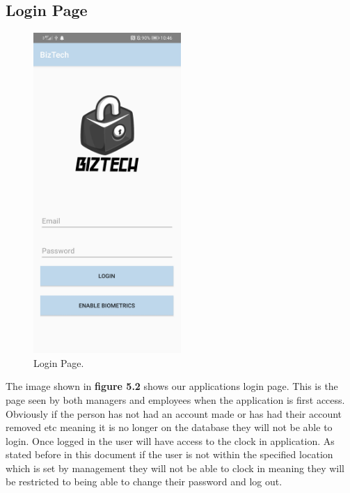 \subsection{Login Page}
\begin{figure}[h]
    \centering
    \includegraphics[width=0.5\textwidth]{img/LoginPage.jpg}
    \caption{Login Page.}
    \label{fig}
\end{figure}
The image shown in \textbf{figure 5.2} shows our applications login page. This is the page seen by both managers and employees when the application is first access. Obviously if the person has not had an account made or has had their account removed etc meaning it is no longer on the database they will not be able to login. Once logged in the user will have access to the clock in application. As stated before in this document if the user is not within the specified location which is set by management they will not be able to clock in meaning they will be restricted to being able to change their password and log out.
\FloatBarrier

